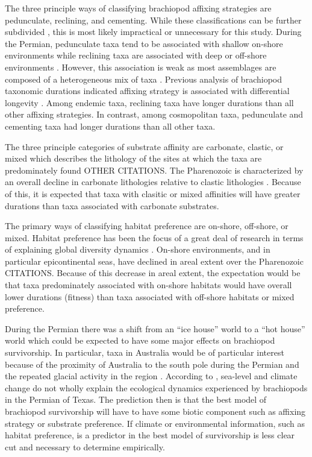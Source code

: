 \documentclass[12pt,letterpaper]{article}
\begin{document}
The three principle ways of classifying brachiopod affixing strategies are pedunculate, reclining, and cementing. While these classifications can be further subdivided \citep{Alexander1977}, this is most likely impractical or unnecessary for this study. During the Permian, pedunculate taxa tend to be associated with shallow on-shore environments while reclining taxa are associated with deep or off-shore environments \citep{Clapham2007}. However, this association is weak as most assemblages are composed of a heterogeneous mix of taxa \citep{Clapham2007}. Previous analysis of brachiopod taxonomic durations indicated affixing strategy is associated with differential longevity \citep{Alexander1977}. Among endemic taxa, reclining taxa have longer durations than all other affixing strategies. In contrast, among cosmopolitan taxa, pedunculate and cementing taxa had longer durations than all other taxa. 

The three principle categories of substrate affinity are carbonate, clastic, or mixed which describes the lithology of the sites at which the taxa are predominately found \citep{Foote2006} OTHER CITATIONS. The Pharenozoic is characterized by an overall decline in carbonate lithologies relative to clastic lithologies \citep{Foote2006,Miller2001}. Because of this, it is expected that taxa with clasitic or mixed affinities will have greater durations than taxa associated with carbonate substrates. %

The primary ways of classifying habitat preference are on-shore, off-shore, or mixed. Habitat preference has been the focus of a great deal of research in terms of explaining global diversity dynamics \citep{Sepkoski1991}. On-shore environments, and in particular epicontinental seas, have declined in areal extent over the Pharenozoic CITATIONS. Because of this decrease in areal extent, the expectation would be that taxa predominately associated with on-shore habitats would have overall lower durations (fitness) than taxa associated with off-shore habitats or mixed preference.

During the Permian there was a shift from an ``ice house'' world to a ``hot house'' world \citep{Fielding2006,Birgenheier2010,Jones2006,Powell2007} which could be expected to have some major effects on brachiopod survivorship. In particular, taxa in Australia would be of particular interest because of the proximity of Australia to the south pole during the Permian and the repeated glacial activity in the region \citep{Fielding2006,Birgenheier2010,Jones2006}. According to \citet{Olszewski2004}, sea-level and climate change do not wholly explain the ecological dynamics experienced by brachiopods in the Permian of Texas. The prediction then is that the best model of brachiopod survivorship will have to have some biotic component such as affixing strategy or substrate preference. If climate or environmental information, such as habitat preference, is a predictor in the best model of survivorship is less clear cut and necessary to determine empirically.
\end{document}
